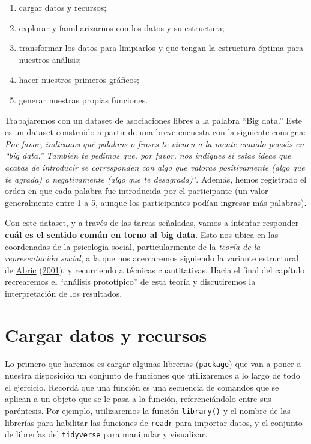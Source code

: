 \documentclass[
]{book}
\providecommand{\tightlist}{%
  \setlength{\itemsep}{0pt}\setlength{\parskip}{0pt}}
\begin{document}
\begin{enumerate}
\def\labelenumi{\arabic{enumi}.}
\tightlist
\item
  cargar datos y recursos;
\item
  explorar y familiarizarnos con los datos y su estructura;
\item
  transformar los datos para limpiarlos y que tengan la estructura óptima para nuestros análisis;
\item
  hacer nuestros primeros gráficos;
\item
  generar nuestras propias funciones.
\end{enumerate}

Trabajaremos con un dataset de asociaciones libres a la palabra ``Big data.'' Este es un dataset construido a partir de una breve encuesta con la siguiente consigna: \emph{Por favor, indicanos qué palabras o frases te vienen a la mente cuando pensás en ``big data.'' También te pedimos que, por favor, nos indiques si estas ideas que acabas de introducir se corresponden con algo que valoras positivamente (algo que te agrada) o negativamente (algo que te desagrada)"}. Además, hemos registrado el orden en que cada palabra fue introducida por el participante (un valor generalmente entre 1 a 5, aunque los participantes podían ingresar más palabras).

Con este dataset, y a través de las tareas señaladas, vamos a intentar responder \textbf{cuál es el sentido común en torno al big data}. Esto nos ubica en las coordenadas de la psicología social, particularmente de la \emph{teoría de la representación social}, a la que nos acercaremos siguiendo la variante estructural de \protect\hyperlink{ref-Abric2001}{Abric} (\protect\hyperlink{ref-Abric2001}{2001}), y recurriendo a técnicas cuantitativas. Hacia el final del capítulo recrearemos el ``análisis prototípico'' de esta teoría y discutiremos la interpretación de los resultados.

\hypertarget{cargar-datos-y-recursos}{%
\section{Cargar datos y recursos}\label{cargar-datos-y-recursos}}

Lo primero que haremos es cargar algunas librerias (\texttt{package}) que van a poner a nuestra disposición un conjunto de funciones que utilizaremos a lo largo de todo el ejercicio. Recordá que una función es una secuencia de comandos que se aplican a un objeto que se le pasa a la función, referenciándolo entre sus paréntesis. Por ejemplo, utilizaremos la función \texttt{library()} y el nombre de las librerías para habilitar las funciones de \texttt{readr} para importar datos, y el conjunto de librerías del \texttt{tidyverse} para manipular y visualizar.
\end{document}
